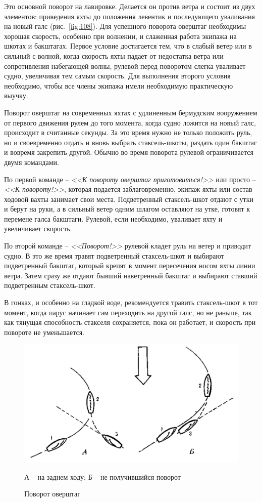 \documentclass[a4paper, 12pt, twoside, final]{scrbook}
\begin{document}
Это основной поворот на лавировке. Делается он против ветра и состоит из двух элементов: приведения яхты до положения левентик и последующего уваливания на новый галс (рис.~\ref{fig:108}). Для успешного поворота оверштаг необходимы хорошая скорость, особенно при волнении, и слаженная работа экипажа на шкотах и бакштагах. Первое условие достигается тем, что в слабый ветер или в сильный с волной, когда скорость яхты падает от недостатка ветра или сопротивления набегающей волны, рулевой перед поворотом слегка уваливает судно, увеличивая тем самым скорость. Для выполнения второго условия необходимо, чтобы все члены экипажа имели необходимую практическую выучку.

Поворот оверштаг на современных яхтах с удлиненным бермудским вооружением от первого движения рулем до того момента, когда судно ложится на новый галс, происходит в считанные секунды. За это время нужно не только положить руль, но и своевременно отдать и вновь выбрать стаксель-шкоты, раздать один бакштаг и вовремя закрепить другой. Обычно во время поворота рулевой ограничивается двумя командами.

По первой команде \--- \textit{<<К повороту оверштаг приготовиться!>>} или просто \--- \textit{<<К повороту!>>}, которая подается заблаговременно, экипаж яхты или состав ходовой вахты занимает свои места. Подветренный стаксель-шкот отдают с утки и берут на руки, а в сильный ветер одним шлагом оставляют на утке, готовят к перемене галса бакштаги. Рулевой, если необходимо, уваливает яхту и увеличивает скорость.

По второй команде \--- \textit{<<Поворот!>>} рулевой кладет руль на ветер и приводит судно. В это же время травят подветренный стаксель-шкот и выбирают подветренный бакштаг, который крепят в момент пересечения носом яхты линии ветра. Затем сразу же отдают бывший наветренный бакштаг и выбирают ставший подветренным стаксель-шкот.

В гонках, и особенно на гладкой воде, рекомендуется травить стаксель-шкот в тот момент, когда парус начинает сам переходить на другой галс, но не раньше, так как тянущая способность стакселя сохраняется, пока он работает, и скорость при повороте не уменьшается.

\begin{figure}[htbp]
   \centering
   \includegraphics{pics/109_Povorot_overshtag} %
   \caption{Поворот оверштаг}
   \label{fig:109}
   \centering\small
   А \--- на заднем ходу; Б \--- не получившийся поворот
\end{figure}
\end{document}
